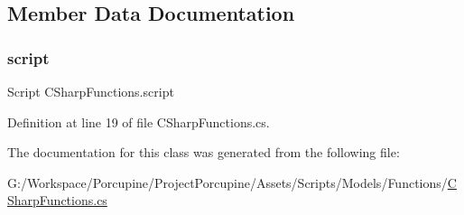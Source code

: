 \subsection{Member Data Documentation}
\mbox{\label{class_c_sharp_functions_a92ab2b9c669d0471db1ecb4f2d7a4e68}} 
\subsubsection{\texorpdfstring{script}{script}}
{\footnotesize\ttfamily Script C\+Sharp\+Functions.\+script\hspace{0.3cm}{\ttfamily [protected]}}



Definition at line 19 of file C\+Sharp\+Functions.\+cs.



The documentation for this class was generated from the following file\+:\begin{DoxyCompactItemize}
\item 
G\+:/\+Workspace/\+Porcupine/\+Project\+Porcupine/\+Assets/\+Scripts/\+Models/\+Functions/\hyperlink{_c_sharp_functions_8cs}{C\+Sharp\+Functions.\+cs}\end{DoxyCompactItemize}
